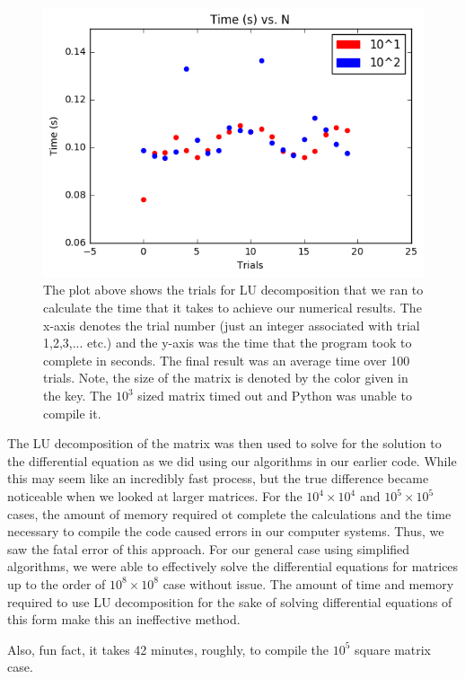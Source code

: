 \documentclass{article}
\begin{document}
\begin{figure}
	\includegraphics[width = \linewidth]{LU_N_comparison_graph.png}
	\caption{The plot above shows the trials for LU decomposition that we ran to calculate the time that it takes to achieve our numerical results. The x-axis denotes the trial number (just an integer associated with trial 1,2,3,... etc.) and the y-axis was the time that the program took to complete in seconds. The final result was an average time over 100 trials. Note, the size of the matrix is denoted by the color given in the key. The $10^{3}$ sized matrix timed out and Python was unable to compile it.}
\end{figure}

The LU decomposition of the matrix was then used to solve for the solution to the differential equation as we did using our algorithms in our earlier code. While this may seem like an incredibly fast process, but the true difference became noticeable when we looked at larger matrices. For the $10^{4}\times 10^{4}$ and $10^{5}\times 10^{5}$ cases, the amount of memory required ot complete the calculations and the time necessary to compile the code caused errors in our computer systems. Thus, we saw the fatal error of this approach. For our general case using simplified algorithms, we were able to effectively solve the differential equations for matrices up to the order of $10^{8}\times 10^{8}$ case without issue. The amount of time and memory required to use LU decomposition for the sake of solving differential equations of this form make this an ineffective method. 

Also, fun fact, it takes 42 minutes, roughly, to compile the $10^{5}$ square matrix case.
\end{document}
